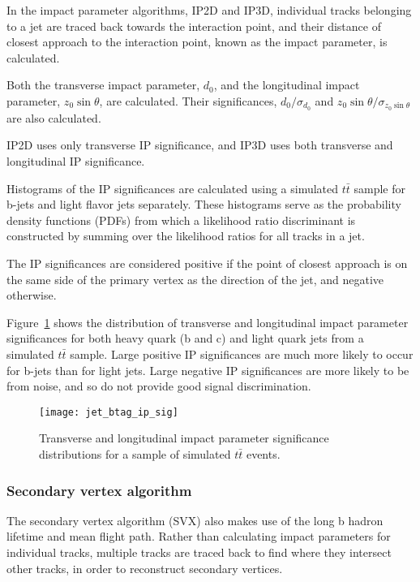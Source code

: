 In the impact parameter algorithms, IP2D and IP3D, individual tracks belonging to a jet are traced back towards the
interaction point, and their distance of closest approach to the interaction point, known as the impact parameter,
is calculated.

Both the transverse impact parameter, $d_0$, and the longitudinal impact parameter, $z_0 \sin\theta$, are calculated.
Their significances, $d_0/ \sigma_{d_0}$ and $z_0 \sin\theta / \sigma_{z_0 \sin\theta}$ are also calculated.

IP2D uses only transverse IP significance, and IP3D uses both transverse and longitudinal IP significance.

Histograms of the IP significances are calculated using a simulated $t\bar{t}$ sample for b-jets and light flavor
jets separately.
These histograms serve as the probability density functions (PDFs) from which a likelihood ratio discriminant is
constructed by summing over the likelihood ratios for all tracks in a jet.\cite{jet-bjet-opt}

The IP significances are considered positive if the point of closest approach is on the same side of the primary
vertex as the direction of the jet, and negative otherwise.

Figure~\ref{fig:jet_btag_ip_sig} shows the distribution of transverse and longitudinal impact parameter significances
for both heavy quark (b and c) and light quark jets from a simulated $t\bar{t}$ sample.
Large positive IP significances are much more likely to occur for b-jets than for light jets.
Large negative IP significances are more likely to be from noise, and so do not provide good signal discrimination.

\begin{figure}[!ht]
    \centering
\texttt{[image: jet\_btag\_ip\_sig]}
\caption{Transverse and longitudinal impact parameter significance distributions for a sample of simulated $t\bar{t}$
events.}
\label{fig:jet_btag_ip_sig}
\end{figure}\cite{jet-bjet-opt}

\subsubsection{Secondary vertex algorithm}\label{subsubsec:jet_btag_svx}

The secondary vertex algorithm (SVX) also makes use of the long b hadron lifetime and mean flight path.
Rather than calculating impact parameters for individual tracks, multiple tracks are traced back to find where they
intersect other tracks, in order to reconstruct secondary vertices.\cite{jet-commissioning-b-tagging}

